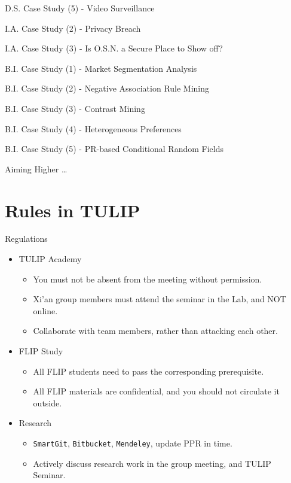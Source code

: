 \documentclass[
 size=14pt,
 paper=smartboard,  %
 mode=present, 		%
 display=slides, 	%
 style=tuliplab,  	%
 pauseslide,
 fleqn,leqno]{powerdot}
\begin{document}
\begin{slide}[toc=,bm=]{D.S. Case Study (5) - Video Surveillance}
\begin{slide}[toc=,bm=]{I.A. Case Study (2) - Privacy Breach}
\begin{slide}[toc=,bm=]{I.A. Case Study (3) - Is O.S.N. a Secure Place to Show off?}
\begin{slide}[toc=,bm=]{B.I. Case Study (1) - Market Segmentation Analysis}
\begin{slide}[toc=,bm=]{B.I. Case Study (2) - Negative Association Rule Mining}
\begin{slide}[toc=,bm=]{B.I. Case Study (3) - Contrast Mining}
\begin{slide}[toc=,bm=]{B.I. Case Study (4) - Heterogeneous Preferences}
\begin{slide}[toc=,bm=]{B.I. Case Study (5) - PR-based Conditional Random Fields}
\begin{slide}{Aiming Higher \dots}
\begin{itemize}
    \end{itemize}
\end{slide}


\section{Rules in TULIP}


\begin{slide}{Regulations}

\begin{center}
\begin{itemize}

\item<1->
{TULIP Academy}

\begin{itemize}
\item
You must not be absent from the meeting without permission.

\item
Xi'an group members must attend the seminar in the Lab,
and NOT online.

\item
Collaborate with team members, rather than attacking each other.
\end{itemize}

\item<2->
{FLIP Study}

\begin{itemize}
\item
All FLIP students need to pass the corresponding prerequisite.

\item
All FLIP materials are confidential, and you should not circulate it outside.
\end{itemize}

\item<3->
{Research}

\begin{itemize}
\item
\texttt{SmartGit}, \texttt{Bitbucket}, \texttt{Mendeley},
update PPR in time.

\item
Actively discuss research work in the group meeting, and TULIP Seminar.


\end{itemize}
\end{itemize}
\end{center}
\end{slide}
\end{slide}
\end{slide}
\end{slide}
\end{slide}
\end{slide}
\end{slide}
\end{slide}
\end{slide}
\end{document}
